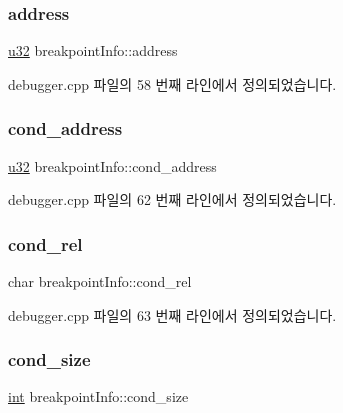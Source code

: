 \subsubsection{\texorpdfstring{address}{address}}
{\footnotesize\ttfamily \mbox{\hyperlink{_system_8h_a10e94b422ef0c20dcdec20d31a1f5049}{u32}} breakpoint\+Info\+::address}



debugger.\+cpp 파일의 58 번째 라인에서 정의되었습니다.

\mbox{\label{structbreakpoint_info_a4a83f60b18f30afe9fa114b21f02de22}} 
\subsubsection{\texorpdfstring{cond\+\_\+address}{cond\_address}}
{\footnotesize\ttfamily \mbox{\hyperlink{_system_8h_a10e94b422ef0c20dcdec20d31a1f5049}{u32}} breakpoint\+Info\+::cond\+\_\+address}



debugger.\+cpp 파일의 62 번째 라인에서 정의되었습니다.

\mbox{\label{structbreakpoint_info_a6819ea8a99055196410b1070f9750f70}} 
\subsubsection{\texorpdfstring{cond\+\_\+rel}{cond\_rel}}
{\footnotesize\ttfamily char breakpoint\+Info\+::cond\+\_\+rel}



debugger.\+cpp 파일의 63 번째 라인에서 정의되었습니다.

\mbox{\label{structbreakpoint_info_a4c2f4f1b0f74562121d829e864d73a0e}} 
\subsubsection{\texorpdfstring{cond\+\_\+size}{cond\_size}}
{\footnotesize\ttfamily \mbox{\hyperlink{_util_8cpp_a0ef32aa8672df19503a49fab2d0c8071}{int}} breakpoint\+Info\+::cond\+\_\+size}



